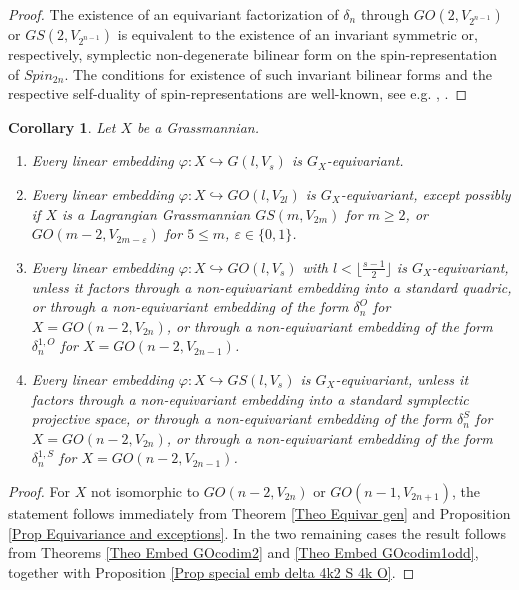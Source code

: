 \documentclass[12pt]{amsart}
\def\hw  {\hookrightarrow}
\newtheorem{coro}[theorem]{Corollary}
\begin{document}
\begin{proof}
The existence of an equivariant factorization of $\delta_n$ through $GO(2,V_{2^{n-1}})$ or $GS(2,V_{2^{n-1}})$ is equivalent to the existence of an invariant symmetric or, respectively, symplectic non-degenerate bilinear form on the spin-representation of $Spin_{2n}$. The conditions for existence of such invariant bilinear forms and the respective self-duality of spin-representations are well-known, see e.g. \cite{Dynkin-Maximal}, \cite{Dynkin-1952}.
\end{proof}


\begin{coro}\label{Coro all equivar in Gls}
Let $X$ be a Grassmannian.
\begin{enumerate}
\item[{\rm (i)}] Every linear embedding $\varphi:X\hw G(l,V_s)$ is $G_X$-equivariant.
\item[{\rm (ii)}] Every linear embedding $\varphi:X\hw GO(l,V_{2l})$ is $G_X$-equivariant, except possibly if $X$ is a Lagrangian Grassmannian $GS(m,V_{2m})$ for $m\geq 2$, or $GO(m-2,V_{2m-\varepsilon})$ for $5\leq m$, $\varepsilon\in\{0,1\}$.
\item[{\rm (iii)}] Every linear embedding $\varphi:X\hw GO(l,V_s)$ with $l<\lfloor\frac{s-1}{2}\rfloor$ is $G_X$-equivariant, unless it factors through a non-equivariant embedding into a standard quadric, or through a non-equivariant embedding of the form $\delta_n^O$ for $X=GO(n-2,V_{2n})$, or through a non-equivariant embedding of the form $\delta_n^{1,O}$ for $X=GO(n-2,V_{2n-1})$.
\item[{\rm (iv)}] Every linear embedding $\varphi:X\hw GS(l,V_s)$ is $G_X$-equivariant, unless it factors through a non-equivariant embedding into a standard symplectic projective space, or through a non-equivariant embedding of the form $\delta_n^S$ for $X=GO(n-2,V_{2n})$, or through a non-equivariant embedding of the form $\delta_n^{1,S}$ for $X=GO(n-2,V_{2n-1})$.
\end{enumerate}
\end{coro}

\begin{proof}
For $X$ not isomorphic to $GO(n-2,V_{2n})$ or $GO(n-1,V_{2n+1})$, the statement follows immediately from Theorem \ref{Theo Equivar gen} and Proposition \ref{Prop Equivariance and exceptions}. In the two remaining cases the result follows from Theorems \ref{Theo Embed GOcodim2} and \ref{Theo Embed GOcodim1odd}, together with Proposition \ref{Prop special emb delta 4k2 S 4k O}.
\end{proof}
\end{document}
